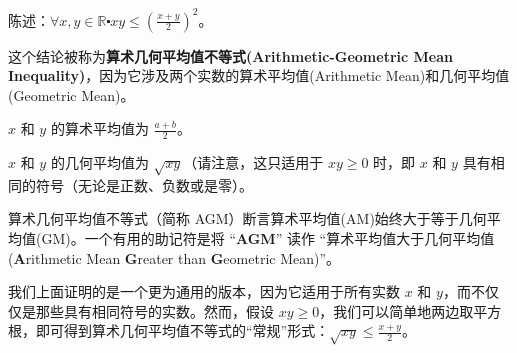 \begin{center}
\noindent {}
\end{center}

\newpage

\begin{example}[算术几何平均值不等式的一个实例]

    \begin{center}
        陈述：$\forall x, y \in \mathbb{R} \centerdot xy \le (\frac{x+y}{2})^2$。
    \end{center}
    \begin{center}
        \noindent {}
    \end{center}
    这个结论被称为\textbf{算术几何平均值不等式(Arithmetic-Geometric Mean Inequality)}，因为它涉及两个实数的算术平均值(Arithmetic Mean)和几何平均值(Geometric Mean)。

    $x$ 和 $y$ 的算术平均值为 $\frac{a+b}{2}$。

    $x$ 和 $y$ 的几何平均值为 $\sqrt{xy}$（请注意，这只适用于 $xy \ge 0$ 时，即 $x$ 和 $y$ 具有相同的符号（无论是正数、负数或是零）。

    算术几何平均值不等式（简称 AGM）断言算术平均值(AM)始终大于等于几何平均值(GM)。一个有用的助记符是将 ``\textbf{AGM}'' 读作 ``算术平均值大于几何平均值(\textbf{A}rithmetic Mean \textbf{G}reater than \textbf{G}eometric Mean)''。

    我们上面证明的是一个更为通用的版本，因为它适用于所有实数 $x$ 和 $y$，而不仅仅是那些具有相同符号的实数。然而，假设 $xy \ge 0$，我们可以简单地两边取平方根，即可得到算术几何平均值不等式的``常规''形式：$\sqrt{xy} \le \frac{x+y}{2}$。
\end{example}

